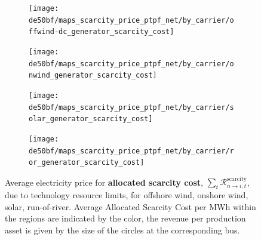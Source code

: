 \documentclass[11pt,twocolumn]{article}
\newcommand{\remainingcost}{\mathcal{R}}
\newcommand{\scarcitycost}{\remainingcost^\text{scarcity}}
\newcommand{\allocatescarcitycost}[1][n \rightarrow i]{\scarcitycost_{#1,t}}
\begin{document}
\begin{figure}
    \centering
    \begin{subfigure}[c]{.49\linewidth}
        \texttt{[image: de50bf/maps\_scarcity\_price\_ptpf\_net/by\_carrier/offwind-dc\_generator\_scarcity\_cost]}
        \label{fig:offwind-dc_generator_scarcity_cost}
    \end{subfigure}
    \begin{subfigure}[c]{.49\linewidth}
        \texttt{[image: de50bf/maps\_scarcity\_price\_ptpf\_net/by\_carrier/onwind\_generator\_scarcity\_cost]}
        \label{fig:onwind_generator_scarcity_cost}
    \end{subfigure}
    \begin{subfigure}[c]{.49\linewidth}
        \texttt{[image: de50bf/maps\_scarcity\_price\_ptpf\_net/by\_carrier/solar\_generator\_scarcity\_cost]}
        \label{fig:solar_generator_scarcity_cost}
    \end{subfigure}
    \begin{subfigure}[c]{.49\linewidth}
        \texttt{[image: de50bf/maps\_scarcity\_price\_ptpf\_net/by\_carrier/ror\_generator\_scarcity\_cost]}
        \label{fig:ror_generator_scarcity_cost}
    \end{subfigure}
    \caption{Average electricity price for \textbf{allocated scarcity cost}, $\sum_t \allocatescarcitycost$, due to technology resource limits, for offshore wind, onshore wind,  solar, run-of-river. Average Allocated Scarcity Cost per MWh within the regions are indicated by the color, the revenue per production asset is given by the size of the circles at the corresponding bus.}
    \label{fig:scarcity_price}
\end{figure}





\clearpage
\printbibliography
\end{document}
